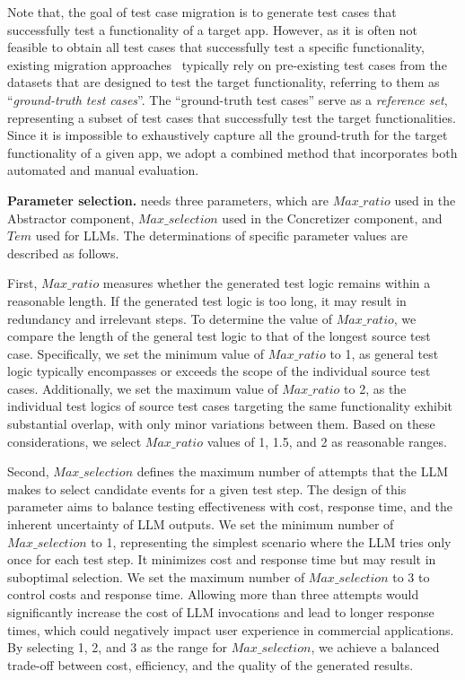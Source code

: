 Note that, the goal of test case migration is to generate test cases that successfully test a functionality of a target app. However, as it is often not feasible to obtain all test cases that successfully test a specific functionality, existing migration approaches~\cite{behrang2019test, zhao2020fruiter, hu2018appflow} typically rely on pre-existing test cases from the datasets that are designed to test the target functionality, referring to them as ``\emph{ground-truth test cases}''.
The ``ground-truth test cases'' serve as a \emph{reference set}, representing a subset of test cases that successfully test the target functionalities. Since it is impossible to exhaustively capture all the ground-truth for the target functionality of a given app, we adopt a combined method that incorporates both automated and manual evaluation.






\textbf{Parameter selection.}
\toolNameSmall{} needs three parameters, which are $Max\_ratio$ used in the Abstractor component, $Max\_selection$ used in the Concretizer component, and $Tem$ used for LLMs.  The determinations of specific parameter values are described as follows.

First, $Max\_ratio$ measures whether the generated test logic remains within a reasonable length. If the generated test logic is too long, it may result in redundancy and irrelevant steps.  
To determine the value of $Max\_ratio$, we compare the length of the general test logic to that of the longest source test case. 
Specifically, we set the minimum value of $Max\_ratio$ to 1, as general test logic typically encompasses or exceeds the scope of the individual source test cases. Additionally, we set the maximum value of $Max\_ratio$ to 2, as the individual test logics of source test cases targeting the same functionality exhibit substantial overlap, with only minor variations between them.
Based on these considerations, we select $Max\_ratio$ values of 1, 1.5, and 2 as reasonable ranges.

Second, $Max\_selection$ defines the maximum number of attempts that the LLM makes to select candidate events for a given test step. The design of this parameter aims to balance testing effectiveness with cost, response time, and the inherent uncertainty of LLM outputs. We set the minimum number of $Max\_selection$ to 1, representing the simplest scenario where the LLM tries only once for each test step. It minimizes cost and response time but may result in suboptimal selection. We set the maximum number of $Max\_selection$ to 3 to control costs and response time. Allowing more than three attempts would significantly increase the cost of LLM invocations and lead to longer response times, which could negatively impact user experience in commercial applications. By selecting 1, 2, and 3 as the range for $Max\_selection$, we achieve a balanced trade-off between cost, efficiency, and the quality of the generated results.

